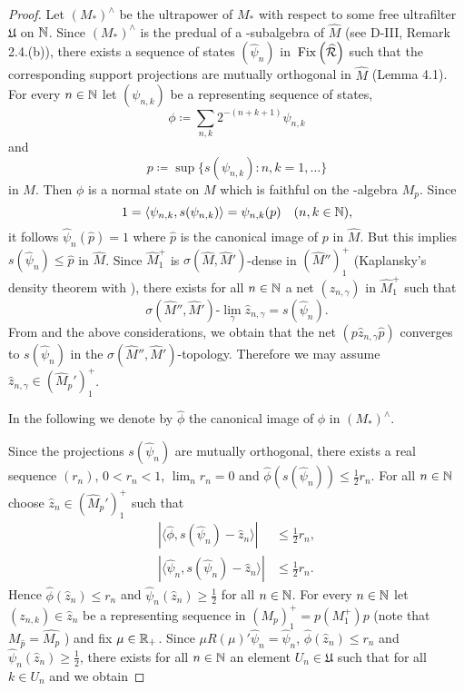 \begin{proof}
Let $ (M_{*})^{\wedge} $  be the ultrapower of $ M_{*} $  with respect to some free ultrafilter $ \mathfrak{U} $  on $ \mathbb{N} $.
Since $ (M_{*})^{\wedge} $  is the predual of a \WA-subalgebra of $ \widehat{M} $  (see D-III, Remark 2.4.(b)), there exists a sequence of states $ (\hat{\psi}_{n}) $  in $ \mathop{}\mathrm{Fix}\left(\widehat{\mathcal{R}}\right) $  such that the corresponding support projections are mutually orthogonal in $ \widehat{M} $  (Lemma 4.1).
For every $ n \in \mathbb{N} $  let $ (\psi_{n,k}) $  be a representing sequence of states, 
\[
\phi \coloneqq \sum_{n,k} 2^{-(n+k+1)} \psi_{n,k}
\]
and 
\[
p \coloneqq \sup\{s(\psi_{n,k}): n,k=1,\ldots\}
\]
in $ M $.
Then $ \phi $  is a normal state on $ M $  which is faithful on the \WA-algebra $ M_{p} $.
Since 
\[
1 = \langle\psi_{n,k},s(\psi_{n,k})\rangle = \psi_{n,k}(p) \quad (n,k \in \mathbb{N}) ,
\]
it follows $ \hat{\psi}_{n}(\hat{p}) = 1 $  where $ \hat{p} $  is the canonical image of $ p $  in $ \widehat{M} $.
%
But this implies $ s(\hat{\psi}_{n}) \leq \hat{p} $  in $ \widehat{M} $.
Since $ \widehat{M}_{1}^{+} $  is $ \sigma(\widehat{M},\widehat{M}') $-dense in $ (\widehat{M}'')_{1}^{+} $  (Kaplansky's density theorem \citet[1.9.1]{sakai:1971} with \citet[1.8.9 and 1.8.12]{sakai:1971}), there exists for all $ n \in \mathbb{N} $  a net $ (z_{n,\gamma}) $  in $ \widehat{M}_{1}^{+} $  such that
\[
\sigma(\widehat{M}'',\widehat{M}')\text{-}\lim_{\gamma} \hat{z}_{n,\gamma} = s(\hat{\psi}_{n}).
\]
From \citet[1.7.8]{sakai:1971} and the above considerations, we obtain that the net $ (p\hat{z}_{n,\gamma}\hat{p}) $  converges to $ s(\hat{\psi}_{n}) $  in the $ \sigma(\widehat{M}'',\widehat{M}') $-topology.
Therefore we may assume $ \hat{z}_{n,\gamma} \in (\widehat{M}_{p}')_{1}^{+} $.

In the following we denote by $ \hat{\phi} $  the canonical image of $ \phi $  in $ (M_{*})^{\wedge} $.

Since the projections $ s(\hat{\psi}_{n}) $  are mutually orthogonal, there exists a real sequence $ (r_{n}) $, $ 0 < r_{n} < 1 $, $ \lim_{n} r_{n} = 0 $  and $ \hat{\phi}(s(\hat{\psi}_{n})) \leq \frac{1}{2}r_{n} $.
For all $ n \in \mathbb{N} $  choose $ \hat{z}_{n} \in (\widehat{M}_{p}')_{1}^{+} $  such that
\begin{align*}
|\langle\hat{\phi},s(\hat{\psi}_{n}) - \hat{z}_{n}\rangle| &\leq \frac{1}{2}r_{n}, \\
|\langle\hat{\psi}_{n},s(\hat{\psi}_{n}) - \hat{z}_{n}\rangle| &\leq \frac{1}{2}r_{n}.
\end{align*}
Hence $ \hat{\phi}(\hat{z}_{n}) \leq r_{n} $  and $ \hat{\psi}_{n}(\hat{z}_{n}) \geq \frac{1}{2} $  for all $ n \in \mathbb{N} $.
For every $ n \in \mathbb{N} $  let $ (z_{n,k}) \in \hat{z}_{n} $  be a representing sequence in $ (M_{p})_{1}^{+} = p(M_{1}^{+})p $  (note that $ {M}_{\hat{p}} = \widehat{M_{p}} $ ) and fix $ \mu \in \mathbb{R}_{+} $.
Since $ \mu R(\mu)'\hat{\psi}_{n} = \hat{\psi}_{n} $, $ \hat{\phi}(\hat{z}_{n}) \leq r_{n} $  and $ \hat{\psi}_{n}(\hat{z}_{n}) \geq \frac{1}{2} $,  there exists for all $ n \in \mathbb{N} $  an element $ U_{n} \in \mathfrak{U} $  such that for all $ k \in U_{n} $ and we obtain


\end{proof}
